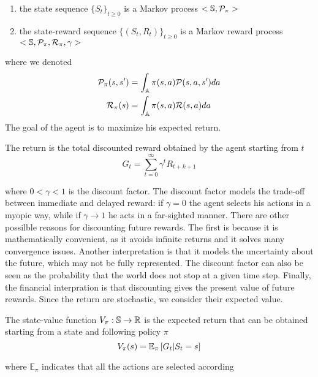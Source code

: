 \begin{enumerate}[label={\roman*)}]
	\item the state sequence ${\{S_t\}}_{t\geq 0}$ is a Markov process $<\S,
		  \calP_\pi>$
	  \item the state-reward sequence ${\{(S_t, R_t)\}}_{t\geq 0}$ is a Markov 
		  reward process $<\S, \calP_\pi, \calR_\pi, \gamma>$
\end{enumerate}
where we denoted 
\begin{equation}
	\begin{split}
		\calP_\pi(s, s') &= \int_\A \pi(s, a) \calP(s, a, s') da\\
		\calR_\pi(s) &= \int_\A \pi(s, a) \calR(s, a) da\\
	\end{split}
\end{equation}
The goal of the agent is to maximize his expected return. 
\begin{definition}[Return]
	The return is the total discounted reward obtained by the agent starting 
	from $t$  
	\begin{equation}
		G_t = \sum^{\infty}_{t=0} \gamma^t R_{t+k+1} 
	\end{equation}
\end{definition}
where $0 < \gamma < 1$ is the discount factor. The discount factor models the
trade-off between immediate and delayed reward: if $\gamma = 0$ the agent
selects his actions in a myopic way, while if $\gamma \to 1$ he acts in a
far-sighted manner. There are other possilble reasons for discounting future
rewards. The first is because it is mathematically convenient, as it avoids
infinite returns and it solves many convergence issues. Another interpretation
is that it models the uncertainty about the future, which may not be fully
represented. The discount factor can also be seen as the probability that the
world does not stop at a given time step. Finally, the financial interpration
is that discounting gives the present value of future rewards. Since the return
are stochastic, we consider their expected value. 
\begin{definition}
	The state-value function $V_\pi: \S \to \R$ is the expected return that can
	be obtained starting from a state and following policy $\pi$
	\begin{equation}
		V_\pi(s) = \E[\pi]{G_t|S_t = s}
	\end{equation}
\end{definition}
where $\mathbb{E}_{\pi}$ indicates that all the actions are selected according
